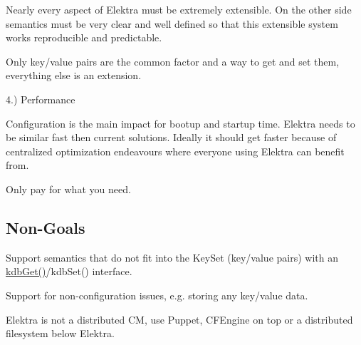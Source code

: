 Nearly every aspect of Elektra must be extremely extensible. On the other side semantics must be very clear and well defined so that this extensible system works reproducible and predictable.

Only key/value pairs are the common factor and a way to get and set them, everything else is an extension.

4.) Performance

Configuration is the main impact for bootup and startup time. Elektra needs to be similar fast then current solutions. Ideally it should get faster because of centralized optimization endeavours where everyone using Elektra can benefit from.

Only pay for what you need.

\subsection*{Non-\/\+Goals}


\begin{DoxyItemize}
\item Support semantics that do not fit into the Key\+Set (key/value pairs) with an \hyperlink{group__kdb_ga28e385fd9cb7ccfe0b2f1ed2f62453a1}{kdb\+Get()}/kdb\+Set() interface.
\item Support for non-\/configuration issues, e.\+g. storing any key/value data.
\item Elektra is not a distributed C\+M, use Puppet, C\+F\+Engine on top or a distributed filesystem below Elektra. 
\end{DoxyItemize}
